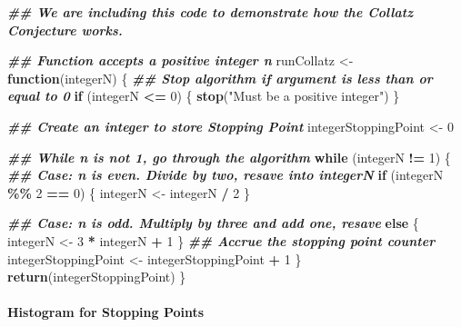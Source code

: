 \documentclass[
]{article}
\newenvironment{Shaded}{\begin{snugshade}}{\end{snugshade}}
\newcommand{\ControlFlowTok}[1]{\textcolor[rgb]{0.13,0.29,0.53}{\textbf{#1}}}
\newcommand{\DecValTok}[1]{\textcolor[rgb]{0.00,0.00,0.81}{#1}}
\newcommand{\DocumentationTok}[1]{\textcolor[rgb]{0.56,0.35,0.01}{\textbf{\textit{#1}}}}
\newcommand{\FunctionTok}[1]{\textcolor[rgb]{0.13,0.29,0.53}{\textbf{#1}}}
\newcommand{\NormalTok}[1]{#1}
\newcommand{\OtherTok}[1]{\textcolor[rgb]{0.56,0.35,0.01}{#1}}
\newcommand{\SpecialCharTok}[1]{\textcolor[rgb]{0.81,0.36,0.00}{\textbf{#1}}}
\newcommand{\StringTok}[1]{\textcolor[rgb]{0.31,0.60,0.02}{#1}}
\begin{document}
\begin{Shaded}
\begin{Highlighting}[]
\DocumentationTok{\#\# We are including this code to demonstrate how the Collatz Conjecture works.}

\DocumentationTok{\#\# Function accepts a positive integer n}
\NormalTok{runCollatz }\OtherTok{\textless{}{-}} \ControlFlowTok{function}\NormalTok{(integerN)                          }
\NormalTok{\{}
\DocumentationTok{\#\# Stop algorithm if argument is less than or equal to 0}
  \ControlFlowTok{if}\NormalTok{ (integerN }\SpecialCharTok{\textless{}=} \DecValTok{0}\NormalTok{)                                      }
\NormalTok{  \{}
    \FunctionTok{stop}\NormalTok{(}\StringTok{"Must be a positive integer"}\NormalTok{)}
\NormalTok{  \}}
  
\DocumentationTok{\#\# Create an integer to store Stopping Point  }
\NormalTok{  integerStoppingPoint }\OtherTok{\textless{}{-}} \DecValTok{0}                               

  
\DocumentationTok{\#\# While n is not 1, go through the algorithm}
  \ControlFlowTok{while}\NormalTok{ (integerN }\SpecialCharTok{!=} \DecValTok{1}\NormalTok{)                                  }
\NormalTok{    \{}
\DocumentationTok{\#\# Case: n is even. Divide by two, resave into integerN}
      \ControlFlowTok{if}\NormalTok{ (integerN }\SpecialCharTok{\%\%} \DecValTok{2} \SpecialCharTok{==} \DecValTok{0}\NormalTok{)                             }
\NormalTok{      \{}
\NormalTok{        integerN }\OtherTok{\textless{}{-}}\NormalTok{ integerN }\SpecialCharTok{/} \DecValTok{2}
\NormalTok{      \}}
    
\DocumentationTok{\#\# Case: n is odd. Multiply by three and add one, resave}
      \ControlFlowTok{else}                                                
\NormalTok{      \{}
\NormalTok{        integerN }\OtherTok{\textless{}{-}} \DecValTok{3} \SpecialCharTok{*}\NormalTok{ integerN }\SpecialCharTok{+} \DecValTok{1}
\NormalTok{      \}}
\DocumentationTok{\#\# Accrue the stopping point counter}
\NormalTok{    integerStoppingPoint }\OtherTok{\textless{}{-}}\NormalTok{ integerStoppingPoint }\SpecialCharTok{+} \DecValTok{1}      
\NormalTok{    \}}
  \FunctionTok{return}\NormalTok{(integerStoppingPoint)}
\NormalTok{\}}
\end{Highlighting}
\end{Shaded}

\hypertarget{histogram-for-stopping-points}{%
\paragraph{Histogram for Stopping
Points}\label{histogram-for-stopping-points}}
\end{document}
